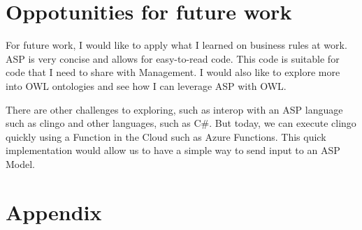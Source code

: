 \documentclass[letterpaper]{article} %
\begin{document}
\section {Oppotunities for future work}

For future work, I would like to apply what I learned on business rules at work. ASP is very concise and allows for easy-to-read code. This code is suitable for code that I need to share with Management. I would also like to explore more into OWL ontologies and see how I can leverage ASP with OWL.

There are other challenges to exploring, such as interop with an ASP language such as clingo and other languages, such as C\#. But today, we can execute clingo quickly using a Function in the Cloud such as Azure Functions. This quick implementation would allow us to have a simple way to send input to an ASP Model. 






\onecolumn %
\section {Appendix}
\end{document}
